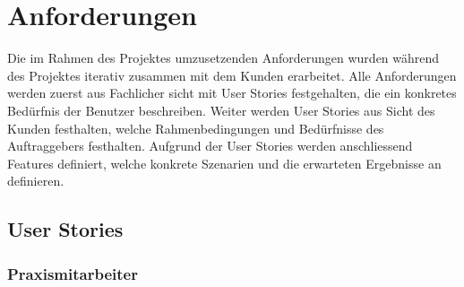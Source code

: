 \section{Anforderungen}\label{sec:anforderungen}

Die im Rahmen des Projektes umzusetzenden Anforderungen wurden während des Projektes iterativ zusammen mit dem Kunden erarbeitet.
Alle Anforderungen werden zuerst aus Fachlicher sicht mit User Stories festgehalten, die ein konkretes Bedürfnis der Benutzer beschreiben.
Weiter werden User Stories aus Sicht des Kunden festhalten, welche Rahmenbedingungen und Bedürfnisse des Auftraggebers festhalten.
Aufgrund der User Stories werden anschliessend Features definiert, welche konkrete Szenarien und die erwarteten Ergebnisse an definieren.

\subsection{User Stories}\label{subsec:user-stories}

\subsubsection*{Praxismitarbeiter}


